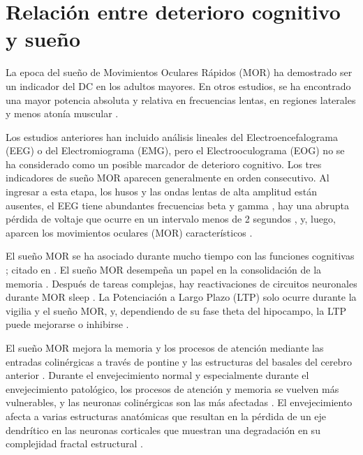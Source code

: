 \section{Relación entre deterioro cognitivo y sueño}

La epoca del sueño de Movimientos Oculares Rápidos (MOR) ha demostrado ser un indicador del DC en los adultos mayores. En otros estudios, se ha encontrado una mayor potencia absoluta y relativa en frecuencias lentas, en regiones laterales \cite{Brayet16} y menos atonía muscular \cite{Chen}.

Los estudios anteriores han incluido análisis lineales del Electroencefalograma (EEG) o del Electromiograma (EMG), pero el Electrooculograma (EOG) no se ha considerado como un posible marcador de deterioro cognitivo. Los tres indicadores de sueño MOR aparecen generalmente en orden consecutivo. Al ingresar a esta etapa, los husos y las ondas lentas de alta amplitud están ausentes, el EEG tiene abundantes frecuencias beta y gamma \cite{SteriadeIntracortical1996,Llinas}, hay una abrupta pérdida de voltaje que ocurre en un intervalo menos de 2 segundos \cite{Rosales-Lagarde2009}, y, luego, aparcen los movimientos oculares (MOR) característicos \cite{AASM07}.



El sueño MOR se ha asociado durante mucho tiempo con las funciones cognitivas \cite{Moruzzi1963}; 
citado en \cite{Corsi1983}. 
%
El sueño MOR desempeña un papel en la consolidación de la memoria 
\cite{Lucero, Fishbein1971, Fishbein1977, Pearlman1971, Pearlman1973, Pearlman1974, Smith}.
%
Después de tareas complejas, hay reactivaciones de circuitos neuronales durante MOR sleep \cite{Louie}. 
La Potenciación a Largo Plazo (LTP) solo ocurre durante la vigilia y el sueño MOR, y, dependiendo de su fase theta del hipocampo, la LTP puede mejorarse o inhibirse \cite{Pavlides1988}.

El sueño MOR mejora la memoria y los procesos de atención mediante las entradas colinérgicas \cite{Braun} a través de pontine \cite{Datta2004} y las estructuras del basales del cerebro anterior \cite{Blake}. Durante el envejecimiento normal y especialmente durante el envejecimiento patológico, los procesos de atención y memoria se vuelven más vulnerables, y las neuronas colinérgicas son las más afectadas \cite{Schliebs11}. El envejecimiento afecta a varias estructuras anatómicas que resultan en la pérdida de un eje dendrítico en las neuronas corticales que muestran una degradación en su complejidad fractal estructural \cite{Lipsitz}.

